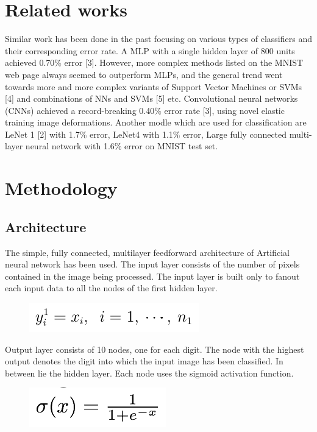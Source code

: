 \documentclass[conference]{IEEEtran}
\begin{document}
\section{Related works}
Similar work has been done in the past focusing on various types of classifiers and their corresponding error rate. A MLP
with a single hidden layer of 800 units achieved 0.70\% error [3]. However, more complex methods listed on the MNIST web page always seemed to outperform MLPs, and the general trend went towards more and more complex variants of Support Vector Machines or SVMs [4] and combinations of NNs and SVMs [5] etc. Convolutional neural networks (CNNs) achieved a record-breaking 0.40\% error rate [3], using novel elastic training image deformations. Another modle which are used for classification are LeNet 1 [2] with 1.7\% error, LeNet4 with 1.1\% error, Large fully connected multi-layer neural network with 1.6\% error on MNIST test set.  
\section{Methodology}
\subsection{Architecture}
The simple, fully connected, multilayer feedforward architecture of Artificial neural network has been used. The input layer consists of the number of pixels contained in the image being processed. The input layer is built only to fanout each input data to all the nodes of the first hidden layer.
\begin{figure}[h]
	\centering
	\includegraphics[width=0.45\linewidth]{inlayer}
\end{figure}

Output layer consists of 10 nodes, one for each digit. The node with the highest output denotes the digit into which the input image has been classified. In between lie the hidden layer. Each node uses the sigmoid activation function.
\begin{figure}[h]
	\centering
	\includegraphics[width=0.3\linewidth]{sigmoid}
\end{figure}
\end{document}
